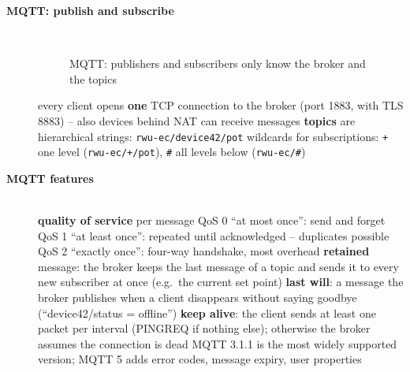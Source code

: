 \begin{description}
\item[{\rot\bf MQTT: publish and subscribe}]~\\[-\lblskip]
\begin{figure}[!hbtp]
\begin{center}
\caption{MQTT: publishers and subscribers only know the broker and the topics}
\end{center}
\end{figure}
\bi
	\ite every client opens \textbf{one} TCP connection to the broker (port 1883, with TLS 8883) -- also devices behind NAT can receive messages
	\ite \textbf{topics} are hierarchical strings: \texttt{rwu-ec/device42/pot}
	\ite wildcards for subscriptions: \texttt{+} one level (\texttt{rwu-ec/+/pot}), \texttt{\#} all levels below (\texttt{rwu-ec/\#})
\ei
\os{\newpage}

\item[{\rot\bf MQTT features}]~\\[-\lblskip]
\bi
	\ite \textbf{quality of service} per message
	\bi
		\ite QoS 0 ``at most once'': send and forget
		\ite QoS 1 ``at least once'': repeated until acknowledged -- duplicates possible
		\ite QoS 2 ``exactly once'': four-way handshake, most overhead
	\ei
	\ite \textbf{retained} message: the broker keeps the last message of a topic and sends it to every new subscriber at once (e.g.\ the current set point)
	\ite \textbf{last will}: a message the broker publishes when a client disappears without saying goodbye (``device42/status = offline'')
	\ite \textbf{keep alive}: the client sends at least one packet per interval (PINGREQ if nothing else); otherwise the broker assumes the connection is dead
	\ite MQTT 3.1.1 is the most widely supported version; MQTT 5 adds error codes, message expiry, user properties
\ei
\os{\newpage}


\end{description}
